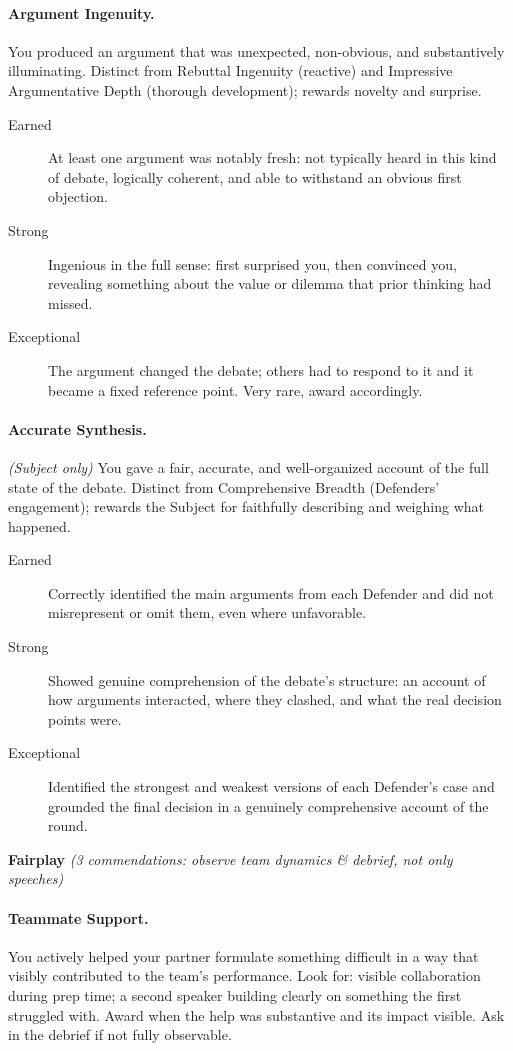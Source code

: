\documentclass[12pt]{article}
\begin{document}
\paragraph{Argument Ingenuity.} You produced an argument that was unexpected, non-obvious, and substantively illuminating. Distinct from Rebuttal Ingenuity (reactive) and Impressive Argumentative Depth (thorough development); rewards novelty and surprise.
\begin{description}
    \item[Earned] At least one argument was notably fresh: not typically heard in this kind of debate, logically coherent, and able to withstand an obvious first objection.
    \item[Strong] Ingenious in the full sense: first surprised you, then convinced you, revealing something about the value or dilemma that prior thinking had missed.
    \item[Exceptional] The argument changed the debate; others had to respond to it and it became a fixed reference point. Very rare, award accordingly.
\end{description}

\paragraph{Accurate Synthesis.} \textit{(Subject only)} You gave a fair, accurate, and well-organized account of the full state of the debate. Distinct from Comprehensive Breadth (Defenders' engagement); rewards the Subject for faithfully describing and weighing what happened.
\begin{description}
    \item[Earned] Correctly identified the main arguments from each Defender and did not misrepresent or omit them, even where unfavorable.
    \item[Strong] Showed genuine comprehension of the debate's structure: an account of how arguments interacted, where they clashed, and what the real decision points were.
    \item[Exceptional] Identified the strongest and weakest versions of each Defender's case and grounded the final decision in a genuinely comprehensive account of the round.
\end{description}

\medskip
\noindent\textbf{Fairplay} \textit{(3 commendations: observe team dynamics \& debrief, not only speeches)}

\paragraph{Teammate Support.} You actively helped your partner formulate something difficult in a way that visibly contributed to the team's performance. Look for: visible collaboration during prep time; a second speaker building clearly on something the first struggled with. Award when the help was substantive and its impact visible. Ask in the debrief if not fully observable.
\end{document}

